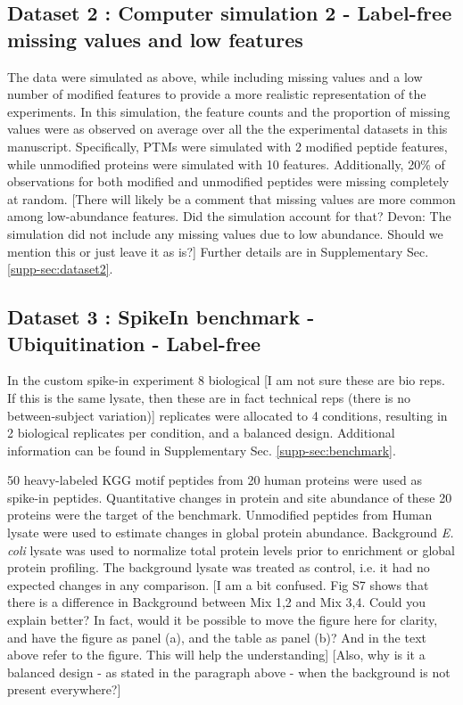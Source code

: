 \documentclass[mcp]{article}
\numberwithin{table}{section}
\def\todo#1{{\color{red}[#1]}}
\begin{document}
\subsection*{Dataset 2 : Computer simulation 2 - Label-free missing values and low features}
\label{sec:comp_sim_procedure2}

The data were simulated as above, while including missing values and a low number of modified features to provide a more realistic representation of the experiments. In this simulation, the feature counts and the proportion of missing values were as observed on average over all the the experimental datasets in this manuscript. Specifically, PTMs were simulated with 2 modified peptide features, while unmodified proteins were simulated with 10 features. Additionally, 20\% of observations for both modified and unmodified peptides were missing completely at random. \todo{There will likely be a comment that missing values are more common among low-abundance features. Did the simulation account for that? Devon: The simulation did not include any missing values due to low abundance. Should we mention this or just leave it as is?} Further details are in Supplementary Sec. \ref{supp-sec:dataset2}.
 
\subsection*{Dataset 3 : SpikeIn benchmark - Ubiquitination - Label-free}
\label{sec:exp_proc_dataset3}

In the custom spike-in experiment 8 biological \todo{I am not sure these are bio reps. If this is the same lysate, then these are in fact technical reps (there is no between-subject variation)} replicates were allocated to 4 conditions, resulting in 2 biological replicates per condition, and a balanced design. Additional information can be found in Supplementary Sec. \ref{supp-sec:benchmark}. 

\medskip {} 50 heavy-labeled KGG motif peptides from 20 human proteins were used as spike-in peptides. Quantitative changes in protein and site abundance of these 20 proteins were the target of the benchmark.  Unmodified peptides from Human lysate were used to estimate changes in global protein abundance. Background {\it E. coli} lysate was used to normalize total protein levels prior to enrichment or global protein profiling. The background lysate was treated as control, i.e. it had no expected changes in any comparison. \todo{I am a bit confused. Fig S7 shows that there is a difference in Background between Mix 1,2 and Mix 3,4. Could you explain better? In fact, would it be possible to move the figure here for clarity, and have the figure as panel (a), and the table as panel (b)? And in the text above refer to the figure. This will help the understanding} \todo{Also, why is it a balanced design - as stated in the paragraph above - when the background is not present everywhere?}
\end{document}
